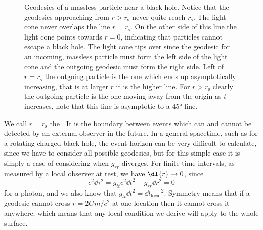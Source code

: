 \documentclass[fleqn]{NotesClass}
\begin{document}
    \begin{figure}
        \caption[Geodesics of a massless particle near a black hole.]{Geodesics of a massless particle near a black hole. Notice that the geodesics approaching from \(r > r_{\mathrm{s}}\) never quite reach \(r_{\mathrm{s}}\). The light cone never overlaps the line \(r = r_{\mathrm{s}}\). On the other side of this line the light cone points towards \(r = 0\), indicating that particles cannot escape a black hole. The light cone tips over since the geodesic for an incoming, massless particle must form the left side of the light cone and the outgoing geodesic must form the right side. Left of \(r = r_{\mathrm{s}}\) the outgoing particle is the one which ends up asymptotically increasing, that is at larger \(r\) it is the higher line. For \(r > r_{\mathrm{s}}\) clearly the outgoing particle is the one moving away from the origin as \(t\) increases, note that this line is asymptotic to a \ang{45} line.}
        \label{fig:geodesics-black-hole-massless}
    \end{figure}
    
    We call \(r = r_{\mathrm{s}}\) the .
    It is the boundary between events which can and cannot be detected by an external observer in the future.
    In a general spacetime, such as for a rotating charged black hole, the event horizon can be very difficult to calculate, since we have to consider all possible geodesics, but for this simple case it is simply a case of considering when \(g_{rr}\) diverges.
    For finite time intervals, as measured by a local observer at rest, we have \(\dl{r} \to 0\), since
    \begin{equation}
        c^2\dd{\tau}^2 = g_{tt} c^2 \dd{t}^2 - g_{rr}\dd{r}^2 = 0
    \end{equation}
    for a photon, and we also know that \(g_{tt} \dd{t}^2 = \dd{t_{\mathrm{local}}}^2\).
    Symmetry means that if a geodesic cannot cross \(r = 2Gm/c^2\) at one location then it cannot cross it anywhere, which means that any local condition we derive will apply to the whole surface.
    
\end{document}
